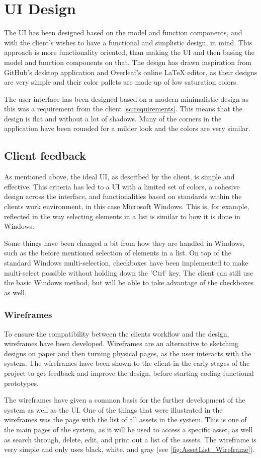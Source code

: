 \chapter{UI Design} \label{ch:ui_design}
The UI has been designed based on the model and function components, and with the client's wishes to have a functional and simplistic design, in mind. This approach is more functionality oriented, than making the UI and then basing the model and function components on that. The design has drawn inspiration from GitHub's desktop application and Overleaf's online LaTeX editor, as their designs are very simple and their color pallets are made up of low saturation colors. \par

The user interface has been designed based on a modern minimalistic design \citep{MinimalistUX} as this was a requirement from the client \autoref{sc:requirements}. This means that the design is flat and without a lot of shadows. Many of the corners in the application have been rounded for a milder look and the colors are very similar.

\section{Client feedback}
As mentioned above, the ideal UI, as described by the client, is simple and effective. This criteria has led to a UI with a limited set of colors, a cohesive design across the interface, and functionalities based on standards within the clients work environment, in this case Microsoft Windows. This is, for example, reflected in the way selecting elements in a list is similar to how it is done in Windows.
\par
Some things have been changed a bit from how they are handled in Windows, such as the before mentioned selection of elements in a list. On top of the standard Windows multi-selection, checkboxes have been implemented to make multi-select possible without holding down the 'Ctrl' key. The client can still use the basic Windows method, but will be able to take advantage of the checkboxes as well.

\subsection{Wireframes}
To ensure the compatibility between the clients workflow and the design, wireframes have been developed. Wireframes are an alternative to sketching designs on paper and then turning physical pages, as the user interacts with the system. The wireframes have been shown to the client in the early stages of the project to get feedback and improve the design, before starting coding functional prototypes.
\par
The wireframes have given a common basis for the further development of the system as well as the UI. One of the things that were illustrated in the wireframes was the page with the list of all assets in the system. This is one of the main pages of the system, as it will be used to access a specific asset, as well as search through, delete, edit, and print out a list of the assets. The wireframe is very simple and only uses black, white, and gray (see \autoref{fig:AssetList_Wireframe}).

